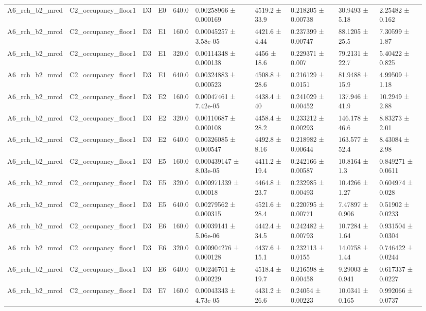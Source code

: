 \begin{table}
\begin{tabular}{llllllllll}
A6\_rch\_b2\_mrcd & C2\_occupancy\_floor1 & D3 & E0 & 640.0 & 0.00258966 ± 0.000169 & 4519.2 ± 33.9 & 0.218205 ± 0.00738 & 30.9493 ± 5.18 & 2.25482 ± 0.162 \\
A6\_rch\_b2\_mrcd & C2\_occupancy\_floor1 & D3 & E1 & 160.0 & 0.00045257 ± 3.58e-05 & 4421.6 ± 4.44 & 0.237399 ± 0.00747 & 88.1205 ± 25.5 & 7.30599 ± 1.87 \\
A6\_rch\_b2\_mrcd & C2\_occupancy\_floor1 & D3 & E1 & 320.0 & 0.00114348 ± 0.000138 & 4456 ± 18.6 & 0.229371 ± 0.007 & 79.2131 ± 22.7 & 5.40422 ± 0.825 \\
A6\_rch\_b2\_mrcd & C2\_occupancy\_floor1 & D3 & E1 & 640.0 & 0.00324883 ± 0.000523 & 4508.8 ± 28.6 & 0.216129 ± 0.0151 & 81.9488 ± 15.9 & 4.99509 ± 1.18 \\
A6\_rch\_b2\_mrcd & C2\_occupancy\_floor1 & D3 & E2 & 160.0 & 0.00047461 ± 7.42e-05 & 4438.4 ± 40 & 0.241029 ± 0.00452 & 137.946 ± 41.9 & 10.2949 ± 2.88 \\
A6\_rch\_b2\_mrcd & C2\_occupancy\_floor1 & D3 & E2 & 320.0 & 0.00110687 ± 0.000108 & 4458.4 ± 28.2 & 0.233212 ± 0.00293 & 146.178 ± 46.6 & 8.83273 ± 2.01 \\
A6\_rch\_b2\_mrcd & C2\_occupancy\_floor1 & D3 & E2 & 640.0 & 0.00326085 ± 0.000547 & 4492.8 ± 8.16 & 0.218982 ± 0.00644 & 163.577 ± 52.4 & 8.43084 ± 2.98 \\
A6\_rch\_b2\_mrcd & C2\_occupancy\_floor1 & D3 & E5 & 160.0 & 0.000439147 ± 8.03e-05 & 4411.2 ± 19.4 & 0.242166 ± 0.00587 & 10.8164 ± 1.3 & 0.849271 ± 0.0611 \\
A6\_rch\_b2\_mrcd & C2\_occupancy\_floor1 & D3 & E5 & 320.0 & 0.000971339 ± 0.00018 & 4464.8 ± 23.7 & 0.232985 ± 0.00493 & 10.4266 ± 1.27 & 0.604974 ± 0.028 \\
A6\_rch\_b2\_mrcd & C2\_occupancy\_floor1 & D3 & E5 & 640.0 & 0.00279562 ± 0.000315 & 4521.6 ± 28.4 & 0.220795 ± 0.00771 & 7.47897 ± 0.906 & 0.51902 ± 0.0233 \\
A6\_rch\_b2\_mrcd & C2\_occupancy\_floor1 & D3 & E6 & 160.0 & 0.00039141 ± 5.06e-06 & 4442.4 ± 34.5 & 0.242482 ± 0.00793 & 10.7284 ± 1.64 & 0.931504 ± 0.0304 \\
A6\_rch\_b2\_mrcd & C2\_occupancy\_floor1 & D3 & E6 & 320.0 & 0.000904276 ± 0.000128 & 4437.6 ± 15.1 & 0.232113 ± 0.0155 & 14.0758 ± 1.44 & 0.746422 ± 0.0244 \\
A6\_rch\_b2\_mrcd & C2\_occupancy\_floor1 & D3 & E6 & 640.0 & 0.00246761 ± 0.000229 & 4518.4 ± 19.7 & 0.216598 ± 0.00458 & 9.29003 ± 0.941 & 0.617337 ± 0.0227 \\
A6\_rch\_b2\_mrcd & C2\_occupancy\_floor1 & D3 & E7 & 160.0 & 0.00043343 ± 4.73e-05 & 4431.2 ± 26.6 & 0.24054 ± 0.00223 & 10.0341 ± 0.165 & 0.992066 ± 0.0737 \\

\end{tabular}
\end{table}
